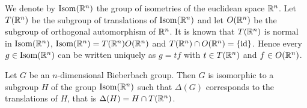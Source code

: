 We denote by $\operatorname{Isom}(\mathbb{R}^n)$ the group of isometries of the euclidean space $\mathbb{R}^n$. Let $T(\mathbb{R}^n)$ be the subgroup of translations of $\operatorname{Isom}(\mathbb{R}^n)$ and let $O(\mathbb{R}^n)$ be the subgroup of orthogonal automorphism of $\mathbb{R}^n$. It is known that $T(\mathbb{R}^n)$ is normal in $\operatorname{Isom}(\mathbb{R}^n)$, $\operatorname{Isom}(\mathbb{R}^n)=T(\mathbb{R}^n)O(\mathbb{R}^n)$ and $T(\mathbb{R}^n)\cap O(\mathbb{R}^n)=\{\operatorname{id}\}$. Hence every $g\in \operatorname{Isom}(\mathbb{R}^n)$ can be written uniquely as $g=tf$ with $t\in T(\mathbb{R}^n)$ and $f\in O(\mathbb{R}^n)$.

\begin{theorem}\label{thm:GeomBieberbach}
Let $G$ be an $n$-dimensional Bieberbach group. Then $G$ is isomorphic to a subgroup $H$ of the group $\operatorname{Isom}(\mathbb{R}^n)$ such that $\Delta(G)$ corresponds to the translations of $H$, that is $\Delta(H)=H\cap T(\mathbb{R}^n)$. 
\end{theorem}

